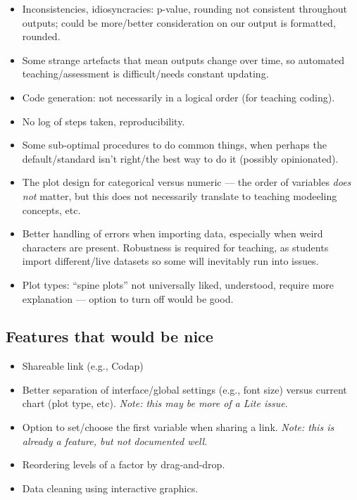 \documentclass{article}
\begin{document}
\begin{itemize}
    \item Inconsistencies, idiosyncracies: p-value, rounding not consistent throughout outputs; could be more/better consideration on our output is formatted, rounded.
    \item Some strange artefacts that mean outputs change over time, so automated teaching/assessment is difficult/needs constant updating.
    \item Code generation: not necessarily in a logical order (for teaching coding).
    \item No log of steps taken, reproducibility.
    \item Some sub-optimal procedures to do common things, when perhaps the default/standard isn't right/the best way to do it (possibly opinionated).
    \item The plot design for categorical versus numeric --- the order of variables \emph{does not} matter, but this does not necessarily translate to teaching modeeling concepts, etc.
    \item Better handling of errors when importing data, especially when weird characters are present. Robustness is required for teaching, as students import different/live datasets so some will inevitably run into issues.
    \item Plot types: ``spine plots'' not universally liked, understood, require more explanation --- option to turn off would be good.
\end{itemize}

\subsection{Features that would be nice}

\begin{itemize}
    \item Shareable link (e.g., Codap)
    \item Better separation of interface/global settings (e.g., font size) versus current chart (plot type, etc). \emph{Note: this may be more of a Lite issue}.
    \item Option to set/choose the first variable when sharing a link. \emph{Note: this is already a feature, but not documented well}.
    \item Reordering levels of a factor by drag-and-drop.
    \item Data cleaning using interactive graphics.
\end{itemize}
\end{document}
